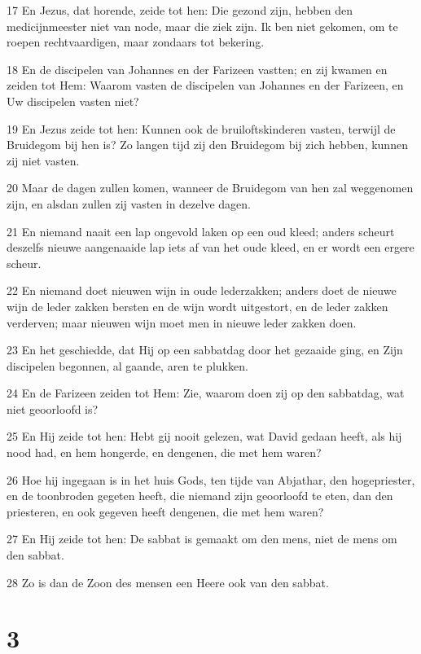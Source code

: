 \par 17 En Jezus, dat horende, zeide tot hen: Die gezond zijn, hebben den medicijnmeester niet van node, maar die ziek zijn. Ik ben niet gekomen, om te roepen rechtvaardigen, maar zondaars tot bekering.
\par 18 En de discipelen van Johannes en der Farizeen vastten; en zij kwamen en zeiden tot Hem: Waarom vasten de discipelen van Johannes en der Farizeen, en Uw discipelen vasten niet?
\par 19 En Jezus zeide tot hen: Kunnen ook de bruiloftskinderen vasten, terwijl de Bruidegom bij hen is? Zo langen tijd zij den Bruidegom bij zich hebben, kunnen zij niet vasten.
\par 20 Maar de dagen zullen komen, wanneer de Bruidegom van hen zal weggenomen zijn, en alsdan zullen zij vasten in dezelve dagen.
\par 21 En niemand naait een lap ongevold laken op een oud kleed; anders scheurt deszelfs nieuwe aangenaaide lap iets af van het oude kleed, en er wordt een ergere scheur.
\par 22 En niemand doet nieuwen wijn in oude lederzakken; anders doet de nieuwe wijn de leder zakken bersten en de wijn wordt uitgestort, en de leder zakken verderven; maar nieuwen wijn moet men in nieuwe leder zakken doen.
\par 23 En het geschiedde, dat Hij op een sabbatdag door het gezaaide ging, en Zijn discipelen begonnen, al gaande, aren te plukken.
\par 24 En de Farizeen zeiden tot Hem: Zie, waarom doen zij op den sabbatdag, wat niet geoorloofd is?
\par 25 En Hij zeide tot hen: Hebt gij nooit gelezen, wat David gedaan heeft, als hij nood had, en hem hongerde, en dengenen, die met hem waren?
\par 26 Hoe hij ingegaan is in het huis Gods, ten tijde van Abjathar, den hogepriester, en de toonbroden gegeten heeft, die niemand zijn geoorloofd te eten, dan den priesteren, en ook gegeven heeft dengenen, die met hem waren?
\par 27 En Hij zeide tot hen: De sabbat is gemaakt om den mens, niet de mens om den sabbat.
\par 28 Zo is dan de Zoon des mensen een Heere ook van den sabbat.

\chapter{3}

